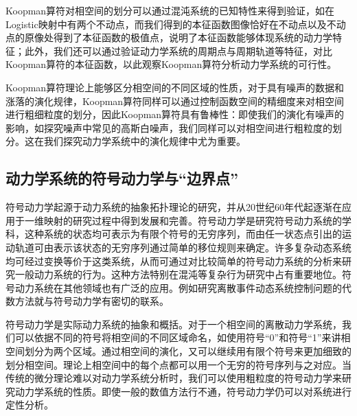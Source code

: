 Koopman算符对相空间的划分可以通过混沌系统的已知特性来得到验证，如在Logistic映射中有两个不动点，而我们得到的本征函数图像恰好在不动点以及不动点的原像处得到了本征函数的极值点，说明了本征函数能够体现系统的动力学特征；此外，我们还可以通过验证动力学系统的周期点与周期轨道等特征，对比Koopman算符的本征函数，以此观察Koopman算符分析动力学系统的可行性。

Koopman算符理论上能够区分相空间的不同区域的性质，对于具有噪声的数据和涨落的演化规律，Koopman算符同样可以通过控制函数空间的精细度来对相空间进行粗细粒度的划分，因此Koopman算符具有鲁棒性：即使我们的演化有噪声的影响，如探究噪声中常见的高斯白噪声，我们同样可以对相空间进行粗粒度的划分。这在我们探究动力学系统中的演化规律中尤为重要。

\subsection{动力学系统的符号动力学与“边界点”}

符号动力学起源于动力系统的抽象拓扑理论的研究，并从20世纪60年代起逐渐在应用于一维映射的研究过程中得到发展和完善。符号动力学是研究符号动力系统的学科，这种系统的状态均可表示为有限个符号的无穷序列，而由任一状态点引出的运动轨道可由表示该状态的无穷序列通过简单的移位规则来确定。许多复杂动态系统均可经过变换等价于这类系统，从而可通过对比较简单的符号动力系统的分析来研究一般动力系统的行为。这种方法特别在混沌等复杂行为研究中占有重要地位。符号动力系统在其他领域也有广泛的应用。例如研究离散事件动态系统控制问题的代数方法就与符号动力学有密切的联系。

符号动力学是实际动力系统的抽象和概括。对于一个相空间的离散动力学系统，我们可以依据不同的符号将相空间的不同区域命名，如使用符号“0”和符号“1”来讲相空间划分为两个区域。通过相空间的演化，又可以继续用有限个符号来更加细致的划分相空间。理论上相空间中的每个点都可以用一个无穷的符号序列与之对应。当传统的微分理论难以对动力学系统分析时，我们可以使用粗粒度的符号动力学来研究动力学系统的性质。即使一般的数值方法行不通，符号动力学仍可以对系统进行定性分析。

